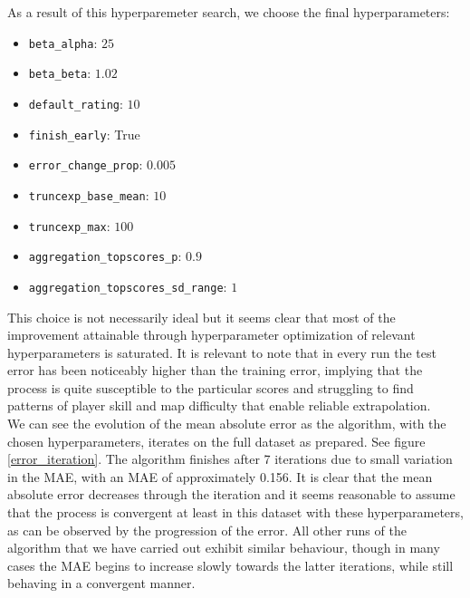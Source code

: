 \documentclass[12pt,a4paper]{article}
\begin{document}
As a result of this hyperparemeter search, we choose the final hyperparameters:

\begin{itemize}

\item \lstinline|beta_alpha|: $25$
\item \lstinline|beta_beta|: $1.02$
\item \lstinline|default_rating|: $10$
\item \lstinline|finish_early|: True
\item \lstinline|error_change_prop|: $0.005$
\item \lstinline|truncexp_base_mean|: $10$
\item \lstinline|truncexp_max|: $100$
\item \lstinline|aggregation_topscores_p|: $0.9$
\item \lstinline|aggregation_topscores_sd_range|: $1$

\end{itemize}

This choice is not necessarily ideal but it seems clear that most of the improvement attainable through hyperparameter optimization of relevant hyperparameters is saturated. It is relevant to note that in every run the test error has been noticeably higher than the training error, implying that the process is quite susceptible to the particular scores and struggling to find patterns of player skill and map difficulty that enable reliable extrapolation.\\

We can see the evolution of the mean absolute error as the algorithm, with the chosen hyperparameters, iterates on the full dataset as prepared. See figure \ref{error_iteration}. The algorithm finishes after 7 iterations due to small variation in the MAE, with an MAE of approximately 0.156. It is clear that the mean absolute error decreases through the iteration and it seems reasonable to assume that the process is convergent at least in this dataset with these hyperparameters, as can be observed by the progression of the error. All other runs of the algorithm that we have carried out exhibit similar behaviour, though in many cases the MAE begins to increase slowly towards the latter iterations, while still behaving in a convergent manner.
\end{document}
